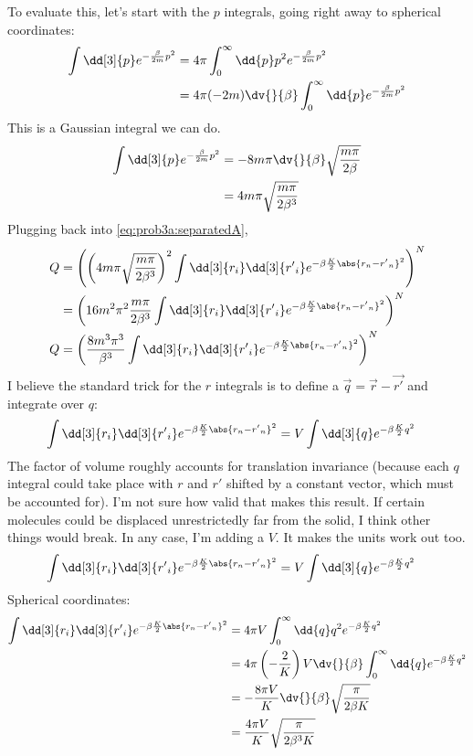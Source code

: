 \documentclass[../../PS3.tex]{subfiles}
\begin{document}
To evaluate this, let's start with the $p$ integrals, going right away to spherical coordinates:
\begin{align}
	\int \dd[3]{p} e^{-\frac{\beta}{2m} p^2} &= 4\pi \int_0^{\infty} \dd{p} p^2 e^{-\frac{\beta}{2m} p^2} \\
	&= 4\pi (-2m) \dv{}{\beta} \int_0^{\infty} \dd{p} e^{-\frac{\beta}{2m} p^2}
\end{align}
This is a Gaussian integral we can do.
\begin{align}
	\int \dd[3]{p} e^{-\frac{\beta}{2m} p^2} &= - 8 m \pi\dv{}{\beta} \sqrt{\frac{m \pi}{2 \beta}} \\
	&= 4 m \pi \sqrt{\frac{m \pi}{2 \beta^3}} 
\end{align}
Plugging back into \eqref{eq:prob3a:separatedA},
\begin{align}
	Q &= \left( \left(4 m \pi \sqrt{\frac{m \pi}{2 \beta^3}}  \right)^2  \int \dd[3]{r_i} \dd[3]{{r'}_i} e^{-\beta \frac{K}{2} \abs{r_n - {r'}_n}^2 }\right) ^N \\
	&= \left( 16 m^2 \pi^2 \frac{m \pi}{2 \beta^3}    \int \dd[3]{r_i} \dd[3]{{r'}_i} e^{-\beta \frac{K}{2} \abs{r_n - {r'}_n}^2 }\right) ^N \\	
	\label{eq:prob3a:pdone} Q &= \left( \frac{8 m^3 \pi^3 }{ \beta^3}  \int \dd[3]{r_i} \dd[3]{{r'}_i} e^{-\beta \frac{K}{2} \abs{r_n - {r'}_n}^2 }\right) ^N	
\end{align}
I believe the standard trick for the $r$ integrals is to define a $\vec{q} = \vec{r} - \vec{r'}$ and integrate over $q$:
\begin{align}
	\int \dd[3]{r_i} \dd[3]{{r'}_i} e^{-\beta \frac{K}{2} \abs{r_n - {r'}_n}^2 } &= V \int \dd[3]{q} e^{-\beta \frac{K}{2} q^2 }
\end{align}
The factor of volume roughly accounts for translation invariance (because each $q$ integral could take place with $r$ and $r'$ shifted by a constant vector, which must be accounted for). I'm not sure how valid that makes this result. If certain molecules could be displaced unrestrictedly far from the solid, I think other things would break. In any case, I'm adding a $V$. It makes the units work out too.
\begin{align}
	\int \dd[3]{r_i} \dd[3]{{r'}_i} e^{-\beta \frac{K}{2} \abs{r_n - {r'}_n}^2 } &= V \int \dd[3]{q} e^{-\beta \frac{K}{2} q^2 }
\end{align}
Spherical coordinates:
\begin{align}
	\int \dd[3]{r_i} \dd[3]{{r'}_i} e^{-\beta \frac{K}{2} \abs{r_n - {r'}_n}^2 } &= 4\pi V \int_0^{\infty} \dd{q} q^2 e^{-\beta \frac{K}{2} q^2 } \\
	&= 4\pi \left(- \frac{2}{K} \right)V \dv{}{\beta} \int_0^{\infty} \dd{q} e^{-\beta \frac{K}{2} q^2 } \\
	&= - \frac{8 \pi V}{K} \dv{}{\beta} \sqrt{\frac{\pi}{2 \beta K}} \\
	&= \frac{4 \pi V}{K} \sqrt{\frac{\pi}{2 \beta^3 K}} \\
\end{align}
\end{document}
